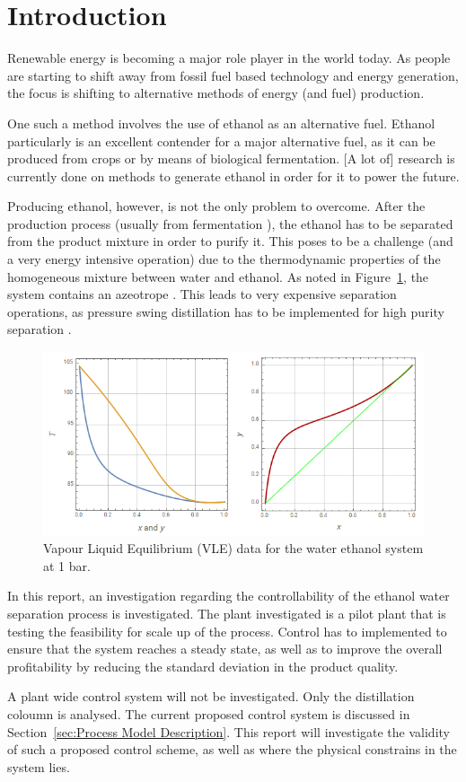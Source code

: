 \section{Introduction}

Renewable energy is becoming a major role player in the world today. As people are starting to shift away from fossil fuel based technology and energy generation, the focus is shifting to alternative methods of energy (and fuel) production.

One such a method involves the use of ethanol as an alternative fuel. Ethanol particularly is an excellent contender for a major alternative fuel, as it can be produced from crops or by means of biological fermentation. [A lot of] research is currently done on methods to generate ethanol in order for it to power the future. 

Producing ethanol, however, is not the only problem to overcome. After the production process (usually from fermentation \parencite{henstra}), the ethanol has to be separated from the product mixture in order to purify it. This poses to be a challenge (and a very energy intensive operation) due to the thermodynamic properties of the homogeneous mixture between water and ethanol. As noted in Figure~\ref{fig:vle-ethanol}, the system contains an azeotrope \parencite{wankat}. This leads to very expensive separation operations, as pressure swing distillation has to be implemented for high purity separation \parencite{perry}.

\begin{figure}[tbph!]
	\centering
	\includegraphics[width=0.7\linewidth]{"Figures/VLE Ethanol 2"}
	\caption{Vapour Liquid Equilibrium (VLE) data for the water ethanol system at 1 bar.}
	\label{fig:vle-ethanol}
\end{figure}

In this report, an investigation regarding the controllability of the ethanol water separation process is investigated. The plant investigated is a pilot plant that is testing the feasibility for scale up of the process. Control has to implemented to ensure that the system reaches a steady state, as well as to improve the overall profitability by reducing the standard deviation in the product quality.

A plant wide control system will not be investigated. Only the distillation coloumn is analysed. The current proposed control system is discussed in Section~\ref{sec:Process Model Description}. This report will investigate the validity of such a proposed control scheme, as well as where the physical constrains in the system lies.